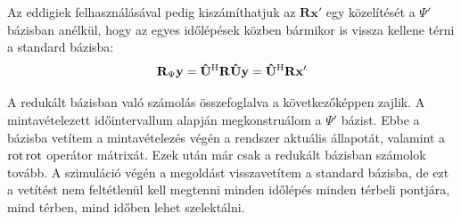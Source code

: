             Az eddigiek felhasználásával pedig kiszámíthatjuk az $\mathbf{R}\mathbf{x'}$ egy közelítését a $\Psi'$ bázisban anélkül, hogy az egyes időlépések közben bármikor is vissza kellene térni a standard bázisba:
            \begin{equation}
                \mathbf{R}_{\Psi}\mathbf{y} =
                \mathbf{\hat{U}}^{\mathrm{H}}\mathbf{R}\mathbf{\hat{U}}\mathbf{y} =
                \mathbf{\hat{U}}^{\mathrm{H}}\mathbf{R}\mathbf{x'}
            \end{equation}
            \par
            A redukált bázisban való számolás összefoglalva a következőképpen zajlik. A mintavételezett időintervallum alapján megkonstruálom a $\Psi'$ bázist. Ebbe a bázisba vetítem a mintavételezés végén a rendszer aktuális állapotát, valamint a $\operatorname{rot}\operatorname{rot}$ operátor mátrixát. Ezek után már csak a redukált bázisban számolok tovább. A szimuláció végén a megoldást visszavetítem a standard bázisba, de ezt a vetítést nem feltétlenül kell megtenni minden időlépés minden térbeli pontjára, mind térben, mind időben lehet szelektálni.
